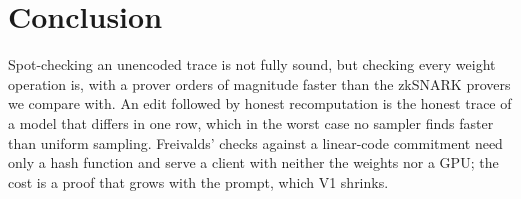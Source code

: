 \section{Conclusion}
\label{sec:conclusion}

Spot-checking an unencoded trace is not fully sound, but checking every weight operation is, with a
prover orders of magnitude faster than the zkSNARK provers we compare with. An edit followed by
honest recomputation is the honest trace of a model that differs in one row, which in the worst case
no sampler finds faster than uniform sampling. Freivalds' checks against a linear-code commitment
need only a hash function and serve a client with neither the weights nor a GPU; the cost is a proof
that grows with the prompt, which V1 shrinks.
